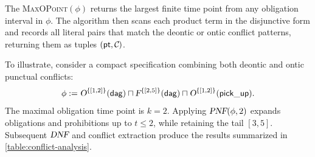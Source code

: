 The \textsc{MaxOPoint}$(\phi)$ returns the largest finite time point from any obligation interval in $\phi$.  
The algorithm then scans each product term in the disjunctive form and records all literal pairs that match the deontic or ontic conflict patterns, returning them as tuples $(\pt,\mathcall{C})$.
\begin{example}\label{ex:easy}
To illustrate, consider a compact specification combining both deontic and ontic punctual conflicts:
\[
\phi := \textsl{O}^{\{[1,2]\}}(\mathsf{\mathsf{dag}}) 
\sqcap 
\textsl{F}^{\{[2,5]\}}(\mathsf{\mathsf{dag}}) 
\sqcap 
\textsl{O}^{\{[1,2]\}}(\mathsf{{\mathsf{pick\_up}}}).
\]
The maximal obligation time point is $k=2$.  
Applying $\textsl{PNF}(\phi,2)$ expands obligations and prohibitions up to $t\le2$, while retaining the tail $[3,5]$.  
Subsequent $\textsl{DNF}$ and conflict extraction produce the results summarized in \ref{table:conflict-analysis}.


\end{example}
